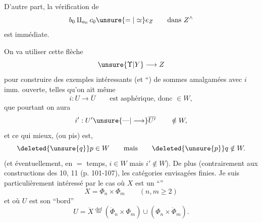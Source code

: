 
D’autre part, la vérification de
\[
b_0\amalg_{a_0}c_0\unsure{=|\simeq}e_Z\qquad\text{dans }Z^{\wedge}
\]
est immédiate.

On va utiliser cette flèche
\[
\unsure{\Upsilon|Y}\longrightarrow Z
\]
pour construire des exemples intéressants (et ``) de sommes amalgamées
avec $i$  imm. ouverte,  telles qu’on ait même
\[
i:U\longrightarrow\overline U\qquad\text{est asphérique, donc }\in W,
\]
  que pourtant on  aura
\[
i':U'\unsure{\text{---}|\longrightarrow}\overline{U'}\qquad\notin W,
\]
et ce qui mieux, (ou pis) est,
\[
\deleted{\unsure{q}}p\in W\qquad\text{mais}\qquad\deleted{\unsure{p}}q\notin W.
\]
(et éventuellement, en $=$ temps, $i\in W$ mais $i'\notin W$). De plus (contrairement aux constructions des  10, 11 (p. 101-107), les catégories envisagées   finies. Je suis particulièrement intéressé par le cas où $X$ est un ``''
\[
X=\Phi_n\times\Phi_m\qquad(n,m\geq 2)
\]
et où $U$ est son ``bord''
\[
U=\dot X\overset{\mathrm{def}}{=}(\dot\Phi_n\times\Phi_m)\cup(\Phi_n\times\dot\Phi_m).
\]



